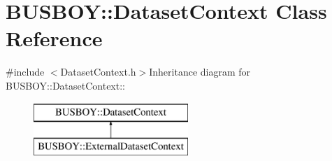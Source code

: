 \hypertarget{classBUSBOY_1_1DatasetContext}{
\section{BUSBOY::DatasetContext Class Reference}
\label{classBUSBOY_1_1DatasetContext}
}


{\ttfamily \#include $<$DatasetContext.h$>$}Inheritance diagram for BUSBOY::DatasetContext::\begin{figure}[H]
\begin{center}
\leavevmode
\includegraphics[height=2cm]{classBUSBOY_1_1DatasetContext}
\end{center}
\end{figure}
